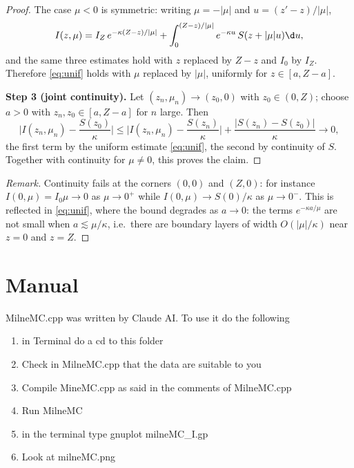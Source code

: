 \documentclass[11pt,a4paper]{article}
\theoremstyle{remark}
\begin{document}
\begin{proof}
The case $\mu<0$ is symmetric: writing $\mu=-|\mu|$ and $u=(z'-z)/|\mu|$,
\[
I(z,\mu)=I_Z\,{e}^{-\kappa(Z-z)/|\mu|}
+\int_0^{(Z-z)/|\mu|}{e}^{-\kappa u}\,S(z+|\mu| u)\d u ,
\]
and the same three estimates hold with $z$ replaced by $Z-z$ and $I_0$ by $I_Z$.
Therefore \eqref{eq:unif} holds with $\mu$ replaced by $|\mu|$, uniformly for
$z\in[a,Z-a]$.

\medskip
\noindent\textbf{Step 3 (joint continuity).}
Let $(z_n,\mu_n)\to(z_0,0)$ with $z_0\in(0,Z)$; choose $a>0$ with
$z_n,z_0\in[a,Z-a]$ for $n$ large. Then
\[
\Big|I(z_n,\mu_n)-\frac{S(z_0)}{\kappa}\Big|
\le \Big|I(z_n,\mu_n)-\frac{S(z_n)}{\kappa}\Big|
+\frac{|S(z_n)-S(z_0)|}{\kappa}\longrightarrow 0,
\]
the first term by the uniform estimate \eqref{eq:unif}, the second by continuity
of $S$. Together with continuity for $\mu\neq0$, this proves the claim.
\end{proof}

\begin{proof}[Remark]
\renewcommand{\qedsymbol}{}
Continuity fails at the corners $(0,0)$ and $(Z,0)$: for instance
$I(0,\mu)=I_0\mu\to0$ as $\mu\to0^+$ while $I(0,\mu)\to S(0)/\kappa$ as
$\mu\to0^-$. This is reflected in \eqref{eq:unif}, where the bound degrades as
$a\to0$: the terms ${e}^{-\kappa a/\mu}$ are not small when $a\lesssim\mu/\kappa$,
i.e.\ there are boundary layers of width $O(|\mu|/\kappa)$ near $z=0$ and $z=Z$.
\end{proof}

\section*{Manual}
MilneMC.cpp was written by Claude AI.  To use it do the following

\begin{enumerate}
\item in Terminal do a cd to this folder

\item Check in MilneMC.cpp that the data are suitable to you

\item Compile MineMC.cpp as said in the comments of MilneMC.cpp

\item Run MilneMC

\item in the terminal type gnuplot milneMC\_I.gp

\item Look at milneMC.png
\end{enumerate}
\end{document}
